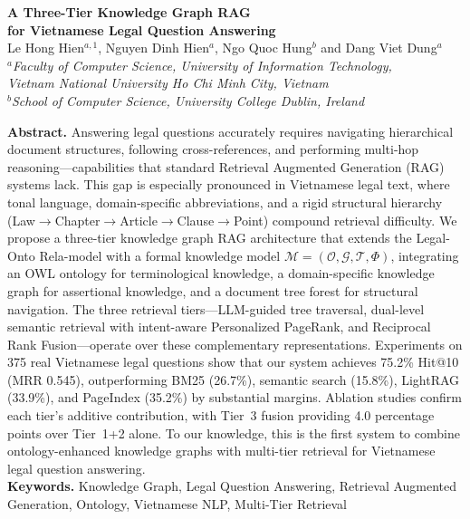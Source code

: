 \documentclass[11pt,a4paper]{article}
\begin{document}
\begin{center}
{\Large\bfseries A Three-Tier Knowledge Graph RAG\\[0.3em] for Vietnamese Legal Question Answering}\\[1.5em]

{\normalsize
Le Hong Hien$^{a,1}$, Nguyen Dinh Hien$^{a}$, Ngo Quoc Hung$^{b}$ and Dang Viet Dung$^{a}$\\[0.5em]
$^a$\textit{Faculty of Computer Science, University of Information Technology,}\\
\textit{Vietnam National University Ho Chi Minh City, Vietnam}\\
$^b$\textit{School of Computer Science, University College Dublin, Ireland}\\[1em]
}
\end{center}

\noindent\textbf{Abstract.} Answering legal questions accurately requires navigating hierarchical document structures, following cross-references, and performing multi-hop reasoning---capabilities that standard Retrieval Augmented Generation (RAG) systems lack. This gap is especially pronounced in Vietnamese legal text, where tonal language, domain-specific abbreviations, and a rigid structural hierarchy (Law$\to$Chapter$\to$Article$\to$Clause$\to$Point) compound retrieval difficulty. We propose a three-tier knowledge graph RAG architecture that extends the Legal-Onto Rela-model with a formal knowledge model $\mathcal{M} = (\mathcal{O}, \mathcal{G}, \mathcal{T}, \Phi)$, integrating an OWL ontology for terminological knowledge, a domain-specific knowledge graph for assertional knowledge, and a document tree forest for structural navigation. The three retrieval tiers---LLM-guided tree traversal, dual-level semantic retrieval with intent-aware Personalized PageRank, and Reciprocal Rank Fusion---operate over these complementary representations. Experiments on 375 real Vietnamese legal questions show that our system achieves 75.2\% Hit@10 (MRR 0.545), outperforming BM25 (26.7\%), semantic search (15.8\%), LightRAG (33.9\%), and PageIndex (35.2\%) by substantial margins. Ablation studies confirm each tier's additive contribution, with Tier~3 fusion providing 4.0 percentage points over Tier~1+2 alone. To our knowledge, this is the first system to combine ontology-enhanced knowledge graphs with multi-tier retrieval for Vietnamese legal question answering.\\[0.5em]

\noindent\textbf{Keywords.} Knowledge Graph, Legal Question Answering, Retrieval Augmented Generation, Ontology, Vietnamese NLP, Multi-Tier Retrieval
\end{document}
